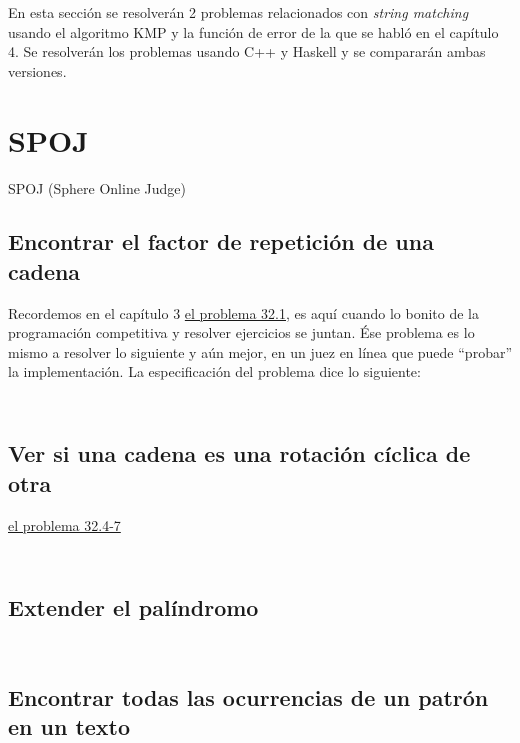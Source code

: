En esta sección se resolverán 2 problemas relacionados con \textit{string matching} usando el
algoritmo KMP y la función de error de la que se habló en el capítulo 4. Se resolverán los
problemas usando C++ y Haskell y se compararán ambas versiones.

\section{SPOJ}
SPOJ (Sphere Online Judge)

\subsection{Encontrar el factor de repetición de una cadena}
Recordemos en el capítulo 3 \hyperlink{repetition_factor}{el problema 32.1}, es aquí cuando lo
bonito de la programación competitiva y resolver ejercicios se juntan. Ése problema es lo mismo
a resolver lo siguiente y aún mejor, en un juez en línea que puede ``probar'' la implementación.
La especificación del problema dice lo siguiente: 


\inputminted[linenos, frame=lines]{cpp}{problemas/cpp/FINDSR.cpp}
\pagebreak

\inputminted[linenos, frame=lines]{haskell}{problemas/haskell/FINDSR.hs}
\pagebreak

\subsection{Ver si una cadena es una rotación cíclica de otra}
\hyperlink{cyclic_rotation}{el problema 32.4-7}


\inputminted[linenos, frame=lines]{cpp}{problemas/cpp/EC_WORLD.cpp}
\pagebreak

\inputminted[linenos, frame=lines]{haskell}{problemas/haskell/EC_WORLD.hs}
\pagebreak

\subsection{Extender el palíndromo}


\inputminted[linenos, frame=lines]{cpp}{problemas/cpp/EPALIN.cpp}
\pagebreak

\inputminted[linenos, frame=lines]{haskell}{problemas/haskell/EPALIN.hs}
\pagebreak

\subsection{Encontrar todas las ocurrencias de un patrón en un texto}


\inputminted[linenos, frame=lines]{cpp}{problemas/cpp/NHAY.cpp}
\pagebreak

\inputminted[linenos, frame=lines]{haskell}{problemas/haskell/NHAY.hs}
\pagebreak


